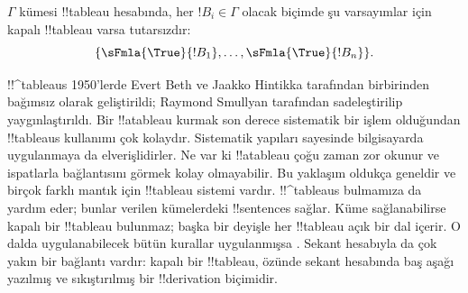 \documentclass[../../../include/open-logic-section]{subfiles}
\begin{document}
$\Gamma$ kümesi !!{tableau} hesabında, her $!B_i\in\Gamma$ olacak biçimde
şu varsayımlar için kapalı !!{tableau} varsa tutarsızdır:
\[
\{\sFmla{\True}{!B_1}, \dots, \sFmla{\True}{!B_n}\}.
\]

!!^{tableau}s 1950'lerde Evert Beth ve Jaakko Hintikka tarafından birbirinden
bağımsız olarak geliştirildi; Raymond Smullyan tarafından sadeleştirilip
yaygınlaştırıldı. Bir !!a{tableau} kurmak son derece sistematik bir işlem
olduğundan !!{tableau}s kullanımı çok kolaydır. Sistematik yapıları sayesinde
bilgisayarda uygulanmaya da elverişlidirler. Ne var ki !!a{tableau} çoğu
zaman zor okunur ve ispatlarla bağlantısını görmek kolay olmayabilir. Bu
yaklaşım oldukça geneldir ve birçok farklı mantık için !!{tableau} sistemi
vardır. !!^{tableau}s  bulmamıza da
yardım eder; bunlar verilen kümelerdeki !!{sentence}s sağlar. Küme
sağlanabilirse kapalı bir !!{tableau} bulunmaz; başka bir deyişle her
!!{tableau} açık bir dal içerir. O dalda uygulanabilecek bütün kurallar
uygulanmışsa . Sekant hesabıyla
da çok yakın bir bağlantı vardır: kapalı bir !!{tableau}, özünde sekant
hesabında baş aşağı yazılmış ve sıkıştırılmış bir !!{derivation} biçimidir.
\end{document}
